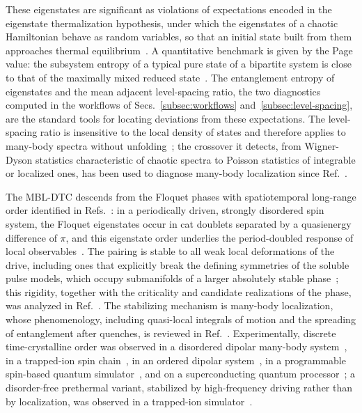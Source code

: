 \documentclass[longbibliography]{revtex4-2}
\begin{document}
These eigenstates are significant as violations of expectations encoded
in the eigenstate thermalization hypothesis, under which the eigenstates
of a chaotic Hamiltonian behave as random variables, so that an initial
state built from them approaches thermal
equilibrium~\cite{srednicki1994chaos}. A quantitative benchmark is given
by the Page value: the subsystem entropy of a typical pure state of a
bipartite system is close to that of the maximally mixed reduced
state~\cite{page1993average}. The entanglement entropy of eigenstates
and the mean adjacent level-spacing ratio, the two diagnostics computed
in the workflows of Secs.~\ref{subsec:workflows}
and~\ref{subsec:level-spacing}, are the standard tools for locating
deviations from these expectations. The level-spacing ratio is
insensitive to the local density of states and therefore applies to
many-body spectra without unfolding~\cite{atas2013distribution}; the
crossover it detects, from Wigner-Dyson statistics characteristic of
chaotic spectra to Poisson statistics of integrable or localized ones,
has been used to diagnose many-body localization since
Ref.~\cite{oganesyan2007localization}.

The MBL-DTC descends from the Floquet phases with spatiotemporal
long-range order identified in Refs.~\cite{khemani2016phase,
else2016floquet}: in a periodically driven, strongly disordered spin
system, the Floquet eigenstates occur in cat doublets separated by a
quasienergy difference of $\pi$, and this eigenstate order underlies
the period-doubled response of local
observables~\cite{khemani2016phase}. The pairing is stable to all weak
local deformations of the drive, including ones that explicitly break
the defining symmetries of the soluble pulse models, which occupy
submanifolds of a larger absolutely stable
phase~\cite{vonkeyserlingk2016absolute}; this rigidity, together with
the criticality and candidate realizations of the phase, was analyzed
in Ref.~\cite{yao2017discrete}. The stabilizing mechanism is
many-body localization, whose phenomenology, including quasi-local
integrals of motion and the spreading of entanglement after quenches,
is reviewed in Ref.~\cite{abanin2019colloquium}. Experimentally,
discrete time-crystalline order was observed in a disordered dipolar
many-body system~\cite{choi2017observation}, in a trapped-ion spin
chain~\cite{zhang2017observationdiscrete}, in an ordered dipolar
system~\cite{rovny2018observation}, in a programmable spin-based
quantum simulator~\cite{randall2021many}, and on a superconducting
quantum processor~\cite{mi2022time}; a disorder-free prethermal
variant, stabilized by high-frequency driving rather than by
localization, was observed in a trapped-ion
simulator~\cite{kyprianidis2021observation}.
\end{document}
